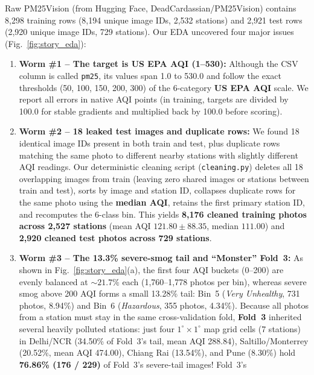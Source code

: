 \documentclass[conference]{IEEEtran}
\begin{document}
Raw PM25Vision (from Hugging Face, DeadCardassian/PM25Vision) contains 8,298
training rows (8,194 unique image IDs, 2,532 stations) and 2,921 test rows
(2,920 unique image IDs, 729 stations). Our EDA uncovered four major issues
(Fig.~\ref{fig:story_eda}):

\begin{enumerate}
  \item \textbf{Worm \#1 -- The target is US EPA AQI (1--530):} Although the CSV
        column is called \texttt{pm25}, its values span 1.0 to 530.0 and follow
        the exact thresholds (50, 100, 150, 200, 300) of the 6-category
        \textbf{US EPA AQI} scale. We report all errors in native AQI points (in
        training, targets are divided by 100.0 for stable gradients and
        multiplied back by 100.0 before scoring).
  \item \textbf{Worm \#2 -- 18 leaked test images and duplicate rows:} We found
        18 identical image IDs present in both train and test, plus duplicate
        rows matching the same photo to different nearby stations with slightly
        different AQI readings. Our deterministic cleaning script
        (\texttt{cleaning.py}) deletes all 18 overlapping images from train
        (leaving zero shared images or stations between train and test), sorts
        by image and station ID, collapses duplicate rows for the same photo
        using the \textbf{median AQI}, retains the first primary station ID, and
        recomputes the 6-class bin. This yields \textbf{8,176 cleaned training
        photos across 2,527 stations} (mean AQI $121.80 \pm 88.35$, median
        $111.00$) and \textbf{2,920 cleaned test photos across 729 stations}.
  \item \textbf{Worm \#3 -- The 13.3\% severe-smog tail and ``Monster'' Fold~3:}
        As shown in Fig.~\ref{fig:story_eda}(a), the first four AQI buckets
        (0--200) are evenly balanced at $\sim 21.7\%$ each (1,760--1,778 photos
        per bin), whereas severe smog above 200 AQI forms a small 13.28\% tail:
        Bin~5 (\textit{Very Unhealthy}, 731 photos, 8.94\%) and Bin~6
        (\textit{Hazardous}, 355 photos, 4.34\%). Because all photos from a
        station must stay in the same cross-validation fold, \textbf{Fold~3}
        inherited several heavily polluted stations: just four
        $1^\circ \times 1^\circ$ map grid cells (7 stations) in Delhi/NCR
        (34.50\% of Fold~3's tail, mean AQI 288.84), Saltillo/Monterrey
        (20.52\%, mean AQI 474.00), Chiang Rai (13.54\%), and Pune (8.30\%) hold
        \textbf{76.86\% (176 / 229)} of Fold~3's severe-tail images! Fold~3's

\end{enumerate}
\end{document}
